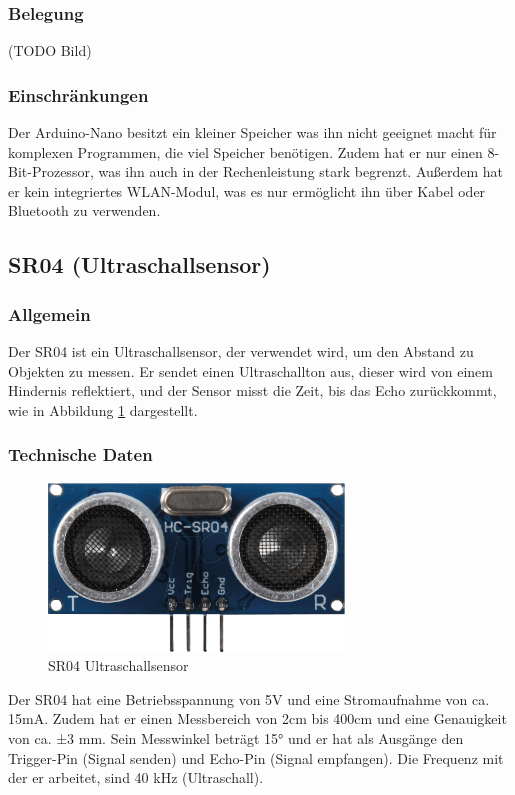 \subsubsection{Belegung}
(TODO Bild)
\subsubsection{Einschränkungen}
Der Arduino-Nano besitzt ein kleiner Speicher was ihn nicht geeignet macht für komplexen Programmen, die viel Speicher benötigen.
%
Zudem hat er nur einen 8-Bit-Prozessor, was ihn auch in der Rechenleistung stark begrenzt.
%
Außerdem hat er kein integriertes WLAN-Modul, 
was es nur ermöglicht ihn  über Kabel oder Bluetooth zu verwenden.
%
\subsection{SR04 (Ultraschallsensor)}
%
\subsubsection{Allgemein}
Der SR04 ist ein Ultraschallsensor,
der verwendet wird, um den Abstand zu Objekten zu messen.
%
Er sendet einen Ultraschallton aus,
dieser wird von einem Hindernis reflektiert,
und der Sensor misst die Zeit,
bis das Echo zurückkommt,
wie in Abbildung \ref{fig:sr04} dargestellt.
\subsubsection{Technische Daten}
\begin{figure}[H]
    \centering
    \includegraphics[width=0.7\textwidth]{img/Hardware/sr04.png}
    \caption{SR04 Ultraschallsensor}
    \label{fig:sr04}
\end{figure}
Der SR04 hat eine Betriebsspannung von 5V und eine Stromaufnahme von ca. 15mA.
%
Zudem hat er einen Messbereich von 2cm bis 400cm und eine Genauigkeit von ca. ±3 mm.
%
Sein Messwinkel beträgt 15°
und er hat als Ausgänge den Trigger-Pin (Signal senden) und Echo-Pin (Signal empfangen). 
%
Die Frequenz mit der er arbeitet, sind 40 kHz (Ultraschall).
